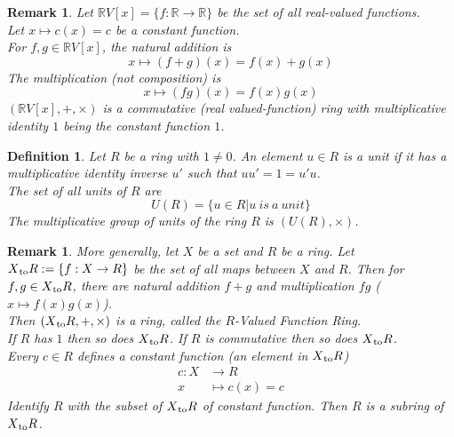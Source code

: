 \documentclass[a4paper,8pt]{article}
\theoremstyle{theorem}
\newtheorem{definition}[theorem]{Definition}
\newtheorem{remark}[theorem]{Remark}
\begin{document}
\begin{remark}
Let $\mathbb{R}V[x]=\{f:\mathbb{R}\rightarrow\mathbb{R}\}$ be the set of all real-valued functions.\\
Let $x\mapsto c(x) = c$ be a constant function.\\
For $f, g \in \mathbb{R}V[x]$, the natural addition is
\begin{equation}
x\mapsto (f+g)(x) = f(x)+g(x) \nonumber
\end{equation}
The multiplication (not composition) is 
\begin{equation}
x\mapsto (fg)(x)=f(x)g(x) \nonumber
\end{equation}
$(\mathbb{R}V[x], +, \times)$ is a commutative \textit{{\color{blue} (real valued-function) ring}} with multiplicative identity $1$ being the constant function $1$.\\
\end{remark}


\begin{definition}
Let $R$ be a ring with $1 \neq 0$. An element $u \in R$ is a \textit{{\color{blue} unit}} if it has a multiplicative identity inverse $u'$ such that $uu'=1=u'u$.\\
The \textit{{\color{blue} set of all units}} of $R$ are 
\begin{equation}
U(R)=\{u\in R | u \ is \ a \ unit\} \nonumber
\end{equation}
The \textit{{\color{blue} multiplicative group of units of the ring}} $R$ is $(U(R), \times)$.\\
\end{definition}


\begin{remark}
More generally, let $X$ be a set and $R$ be a ring. Let $X \textsubscript{to} R := \{f: X \rightarrow R\}$ be the set of all maps between $X$ and $R$. Then for $f, g \in X \textsubscript{to} R $, there are natural addition $f+g$ and multiplication $fg$ ($x\mapsto f(x)g(x)$).\\
Then $(X \textsubscript{to} R, +, \times)$ is a ring, called the \textit{{\color{blue} $R$-Valued Function Ring}}.\\
If $R$ has $1$ then so does $X \textsubscript{to} R$. If $R$ is commutative then so does $X \textsubscript{to} R$.\\
Every $c\in R$ defines a constant function (an element in $X \textsubscript{to} R$)
\begin{align}
c:X &\rightarrow R \nonumber \\
x &\mapsto c(x)=c \nonumber
\end{align}
Identify $R$ with the subset of $X \textsubscript{to} R$ of constant function. Then $R$ is a subring of $X \textsubscript{to} R$.\\
\end{remark}
\end{document}
